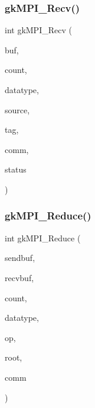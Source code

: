 \mbox{\label{a00951_a4eebc3896a4356902599bd3d3dd077f3}} 
\subsubsection{\texorpdfstring{gk\+M\+P\+I\+\_\+\+Recv()}{gkMPI\_Recv()}}
{\footnotesize\ttfamily int gk\+M\+P\+I\+\_\+\+Recv (\begin{DoxyParamCaption}\item[{void $\ast$}]{buf,  }\item[{\hyperlink{a00876_aaa5262be3e700770163401acb0150f52}{idx\+\_\+t}}]{count,  }\item[{M\+P\+I\+\_\+\+Datatype}]{datatype,  }\item[{\hyperlink{a00876_aaa5262be3e700770163401acb0150f52}{idx\+\_\+t}}]{source,  }\item[{\hyperlink{a00876_aaa5262be3e700770163401acb0150f52}{idx\+\_\+t}}]{tag,  }\item[{M\+P\+I\+\_\+\+Comm}]{comm,  }\item[{M\+P\+I\+\_\+\+Status $\ast$}]{status }\end{DoxyParamCaption})}

\mbox{\label{a00951_ad629e734a85de207a3a6b5b84d6df7e0}} 
\subsubsection{\texorpdfstring{gk\+M\+P\+I\+\_\+\+Reduce()}{gkMPI\_Reduce()}}
{\footnotesize\ttfamily int gk\+M\+P\+I\+\_\+\+Reduce (\begin{DoxyParamCaption}\item[{void $\ast$}]{sendbuf,  }\item[{void $\ast$}]{recvbuf,  }\item[{\hyperlink{a00876_aaa5262be3e700770163401acb0150f52}{idx\+\_\+t}}]{count,  }\item[{M\+P\+I\+\_\+\+Datatype}]{datatype,  }\item[{M\+P\+I\+\_\+\+Op}]{op,  }\item[{\hyperlink{a00876_aaa5262be3e700770163401acb0150f52}{idx\+\_\+t}}]{root,  }\item[{M\+P\+I\+\_\+\+Comm}]{comm }\end{DoxyParamCaption})}

